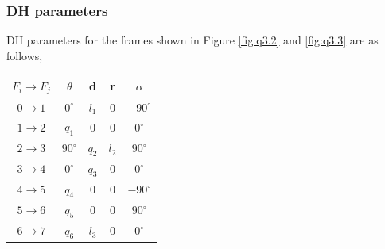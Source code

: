 \documentclass[12pt]{article}
\begin{document}
\subsubsection*{DH parameters}
DH parameters for the frames shown in Figure \ref{fig:q3.2} and \ref{fig:q3.3} are as follows,
\begin{center}
\begin{tabular}{ c | c c c c }
 \hline
 $F_i \to F_j$ & $\theta$ & d & r & $\alpha$ \\
 \hline
 $0 \to 1$ & $0^{\circ}$    & $l_1$                      & $0$     &   $-90^{\circ}$    \\
 $1 \to 2$ & $q_1$          & $0$                        & $0$     &   $0^{\circ}$      \\
 $2 \to 3$ & $90^{\circ}$   & $q_2$                      & $l_2$   &   $90^{\circ}$     \\
 $3 \to 4$ & $0^{\circ}$    & $q_3$                      & $0$     &   $0^{\circ}$      \\
 $4 \to 5$ & $q_4$          & $0$                        & $0$     &   $-90^{\circ}$    \\
 $5 \to 6$ & $q_5$          & $0$                        & $0$     &   $90^{\circ}$     \\
 $6 \to 7$ & $q_6$          & $l_3$                      & $0$     &   $0^{\circ}$      \\
 \hline
\end{tabular}
\end{center}

\pagebreak
\end{document}
